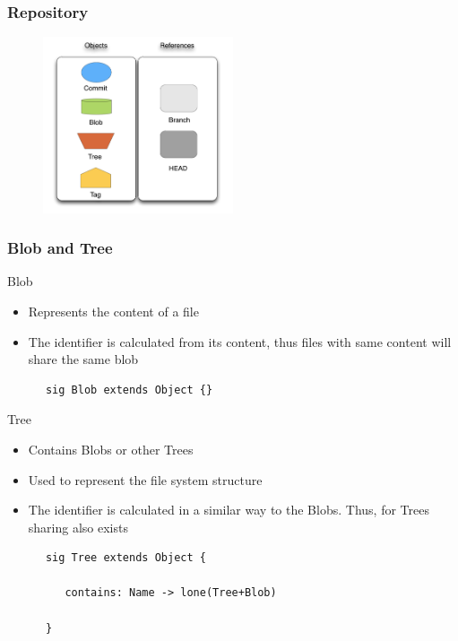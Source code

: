 \documentclass{beamer}
\begin{document}
\begin{frame}
\frametitle{Repository}
   \begin{figure}
      \centering
      \includegraphics[width=0.5\textwidth]{images/legenda2.png}
   \end{figure}
\end{frame}

\begin{frame}[fragile]
   \frametitle{Blob and Tree}
   \begin{block}{Blob}
      \begin{itemize}
         \item Represents the content of a file
         \item The identifier is calculated from its content, thus files with
	 same content will share the same blob
      \end{itemize}
      \tiny
      \color{blue}
      \begin{lstlisting}
      sig Blob extends Object {}
      \end{lstlisting}
   \end{block}
   \begin{block}{Tree}
      \begin{itemize}
         \item Contains Blobs or other Trees 
         \item Used to represent the file system structure
	 \item The identifier is calculated in a similar way to the Blobs. Thus, 
	 for Trees sharing also exists
      \end{itemize}
      \tiny
      \color{blue}
      \begin{lstlisting}
      sig Tree extends Object {
         
         contains: Name -> lone(Tree+Blob)
      
      }
      \end{lstlisting}
   \end{block}
\end{frame}
\end{document}
